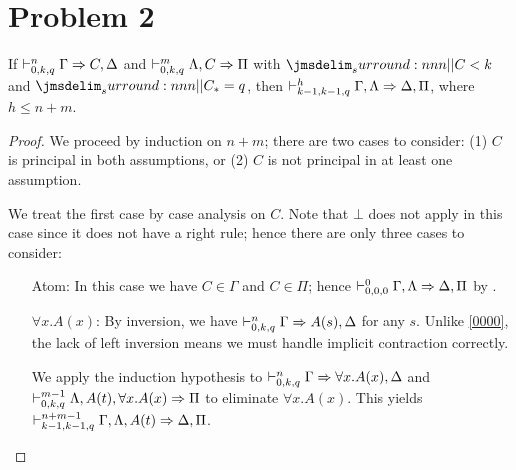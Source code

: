 \documentclass[a4paper]{article}
\begin{document}
\section*{Problem 2}\label{0009}

\begin{lemma}\label{0004}
  If $\mathrel{\vdash^{n}_{0,k,q}} \Gamma \Rightarrow C,\Delta$ and $\mathrel{\vdash^{m}_{0,k,q}} \Lambda,C \Rightarrow \Pi$ with $\cRank{C} < k$ and $\qRank{C} = q$, then $\mathrel{\vdash^{h}_{k-1,k-1,q}} \Gamma,\Lambda \Rightarrow \Delta,\Pi$, where $h \leq n + m$.
\end{lemma}
\begin{proof}
  We proceed by induction on $n + m$; there are two cases to consider: (1) $C$ is principal in both assumptions, or (2) $C$ is not principal in at least one assumption.

  We treat the first case by case analysis on $C$.
  Note that $\bot$ does not apply in this case since it does not have a right rule; hence there are only three cases to consider:
  \begin{itemize}
  \item[Atom:] In this case we have $C \in \Gamma$ and $C \in \Pi$; hence $\mathrel{\vdash^{0}_{0,0,0}} \Gamma,\Lambda \Rightarrow \Delta,\Pi$ by \rId.
  \item[$\forall x.A(x)$:] By inversion, we have $\mathrel{\vdash^{n}_{0,k,q}} \Gamma \Rightarrow A(s),\Delta$ for any $s$.
    Unlike \cref{0000}, the lack of left inversion means we must handle implicit contraction correctly.

    We apply the induction hypothesis to $\mathrel{\vdash^{n}_{0,k,q}} \Gamma \Rightarrow \forall x.A(x), \Delta$ and $\mathrel{\vdash^{m-1}_{0,k,q}} \Lambda,A(t),\forall x.A(x) \Rightarrow \Pi$ to eliminate $\forall x.A(x)$.
    This yields $\mathrel{\vdash^{n+m-1}_{k-1,k-1,q}} \Gamma,\Lambda,A(t) \Rightarrow \Delta,\Pi$.


\end{itemize}
\end{proof}
\end{document}
